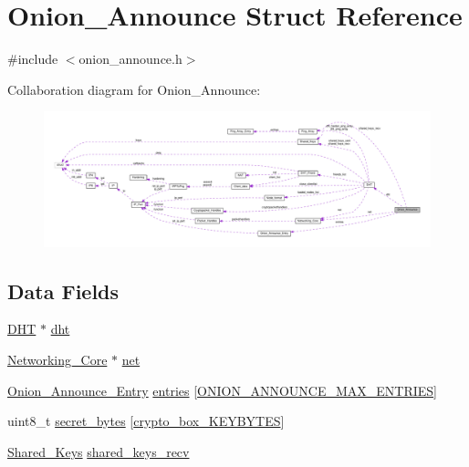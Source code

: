 \hypertarget{struct_onion___announce}{\section{Onion\+\_\+\+Announce Struct Reference}
\label{struct_onion___announce}
}


{\ttfamily \#include $<$onion\+\_\+announce.\+h$>$}



Collaboration diagram for Onion\+\_\+\+Announce\+:
\nopagebreak
\begin{figure}[H]
\begin{center}
\leavevmode
\includegraphics[width=350pt]{d1/d2a/struct_onion___announce__coll__graph}
\end{center}
\end{figure}
\subsection*{Data Fields}
\begin{DoxyCompactItemize}
\item 
\hyperlink{struct_d_h_t}{D\+H\+T} $\ast$ \hyperlink{struct_onion___announce_a8b3d6ce8745acc52695e252bdb1531b6}{dht}
\item 
\hyperlink{struct_networking___core}{Networking\+\_\+\+Core} $\ast$ \hyperlink{struct_onion___announce_aa14ea2f67950f57fe4235d7375a2216c}{net}
\item 
\hyperlink{struct_onion___announce___entry}{Onion\+\_\+\+Announce\+\_\+\+Entry} \hyperlink{struct_onion___announce_a2de468d0c9db89713f12f2e7bd984023}{entries} \mbox{[}\hyperlink{onion__announce_8h_a829b434f935e7fc358b16e8fe65ea1cc}{O\+N\+I\+O\+N\+\_\+\+A\+N\+N\+O\+U\+N\+C\+E\+\_\+\+M\+A\+X\+\_\+\+E\+N\+T\+R\+I\+E\+S}\mbox{]}
\item 
uint8\+\_\+t \hyperlink{struct_onion___announce_ad4bfea97df71f88d6de4cbf53f301928}{secret\+\_\+bytes} \mbox{[}\hyperlink{crypto__core_8h_aade7cd33abc5668970c55ed009ab00c8}{crypto\+\_\+box\+\_\+\+K\+E\+Y\+B\+Y\+T\+E\+S}\mbox{]}
\item 
\hyperlink{struct_shared___keys}{Shared\+\_\+\+Keys} \hyperlink{struct_onion___announce_a4c647e235c4b9d2d6d68d760c7cb1b30}{shared\+\_\+keys\+\_\+recv}
\end{DoxyCompactItemize}


